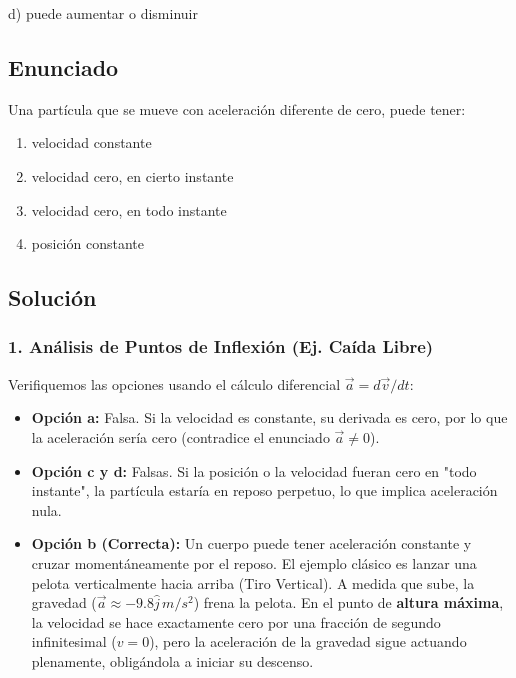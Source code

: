 \documentclass[12pt, a4paper]{article}
\begin{document}
\begin{tcolorbox}[colback=green!5!white, colframe=green!50!black, title=Respuesta Final]
\centering \Large d) puede aumentar o disminuir
\end{tcolorbox}

\newpage

\subsection*{Enunciado}
Una partícula que se mueve con aceleración diferente de cero, puede tener:
\begin{enumerate}[label=\alph*)]
    \item velocidad constante
    \item velocidad cero, en cierto instante
    \item velocidad cero, en todo instante
    \item posición constante
\end{enumerate}

\subsection*{Solución}

\subsubsection*{1. Análisis de Puntos de Inflexión (Ej. Caída Libre)}
Verifiquemos las opciones usando el cálculo diferencial $\vec{a} = d\vec{v}/dt$:
\begin{itemize}
    \item \textbf{Opción a:} Falsa. Si la velocidad es constante, su derivada es cero, por lo que la aceleración sería cero (contradice el enunciado $\vec{a} \neq 0$).
    \item \textbf{Opción c y d:} Falsas. Si la posición o la velocidad fueran cero en "todo instante", la partícula estaría en reposo perpetuo, lo que implica aceleración nula.
    \item \textbf{Opción b (Correcta):} Un cuerpo puede tener aceleración constante y cruzar momentáneamente por el reposo. El ejemplo clásico es lanzar una pelota verticalmente hacia arriba (Tiro Vertical). A medida que sube, la gravedad ($\vec{a} \approx -9.8 \hat{j} \, \si{m/s^2}$) frena la pelota. En el punto de \textbf{altura máxima}, la velocidad se hace exactamente cero por una fracción de segundo infinitesimal ($v = 0$), pero la aceleración de la gravedad sigue actuando plenamente, obligándola a iniciar su descenso.
\end{itemize}
\end{document}
